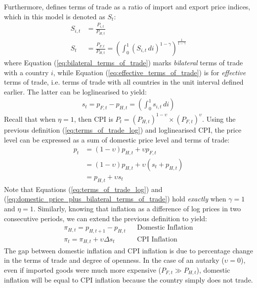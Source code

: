 Furthermore, \textcite{oecd_2022_international} defines terms of trade as a ratio of import and export price indices, which in this model is denoted as $S_t$:
\begin{align}
    S_{i,t} &= \frac{P_{i,t}}{P_{H,t}}                       \label{eq:bilateral_terms_of_trade}                                                                                    \\
    S_{t} &=  \frac{P_{F,t}}{P_{H,t}} = \left(\int_{0}^{1} (S_{i,t} \, di)^{1-\gamma}\right)^{\frac{1}{1-\gamma}}            \label{eq:effective_terms_of_trade}              
\end{align}
where Equation (\ref{eq:bilateral_terms_of_trade}) marks \textit{bilateral} terms of trade with a country $i$, while Equation (\ref{eq:effective_terms_of_trade}) is for \textit{effective} terms of trade, i.e. terms of trade with all countries in the unit interval defined earlier. The latter can be loglinearised to yield:
\begin{align}
    s_t = p_{F,t} - p_{H,t} = \left(\int_{0}^{1} s_{i,t} \, di \right)                                      \label{eq:terms_of_trade_log} 
\end{align}
Recall that when $\eta = 1$, then CPI is $P_t = (P_{H,t})^{1-\upsilon} \times (P_{F,t})^{\upsilon}$. Using the previous definition (\ref{eq:terms_of_trade_log}) and loglinearised CPI, the price level can be expressed as a sum of domestic price level and terms of trade:
\begin{align}
    p_t &= (1-\upsilon)p_{H,t} + \upsilon p_{F,t} \\
    &= (1-\upsilon)p_{H,t} + \upsilon (s_t + p_{H,t}) \\
    &= p_{H,t} + \upsilon s_t \label{eq:domestic_price_plus_bilateral_terms_of_trade}
\end{align}
Note that Equations (\ref{eq:terms_of_trade_log}) and (\ref{eq:domestic_price_plus_bilateral_terms_of_trade}) hold \textit{exactly} when $\gamma=1$ and $\eta = 1$. Similarly, knowing that inflation as a difference of log prices in two consecutive periods, we can extend the previous definition to yield:
\begin{align}
    \pi_{H,t} = p_{H,t+1} - p_{H,t}         &  & \text{Domestic Inflation} \\
    \pi_{t} = \pi_{H,t} + \upsilon \Delta s_t \label{eq:cpi_inflation_tot}&  & \text{CPI Inflation}
\end{align}
The gap between domestic inflation and CPI inflation is due to percentage change in the terms of trade and degree of openness. In the case of an autarky ($\upsilon = 0$), even if imported goods were much more expensive ($P_{F,t} \gg P_{H,t}$), domestic inflation will be equal to CPI inflation because the country simply does not trade.

